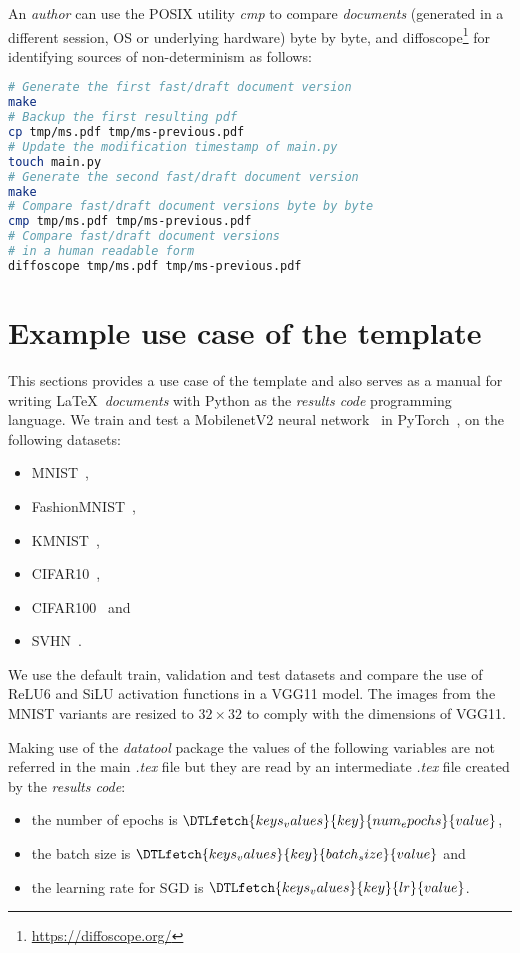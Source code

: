\documentclass[journal]{IEEEtran}
\begin{document}
An \textit{author} can use the POSIX utility \textit{cmp} to compare \textit{documents} (generated in a different session, OS or underlying hardware) byte by byte, and diffoscope\footnote{\url{https://diffoscope.org/}} for identifying sources of non-determinism as follows:
\begin{lstlisting}[language=bash, style=lststyle, caption={Test fast/draft document reproducibility.}]
# Generate the first fast/draft document version
make
# Backup the first resulting pdf
cp tmp/ms.pdf tmp/ms-previous.pdf
# Update the modification timestamp of main.py
touch main.py
# Generate the second fast/draft document version
make
# Compare fast/draft document versions byte by byte
cmp tmp/ms.pdf tmp/ms-previous.pdf
# Compare fast/draft document versions
# in a human readable form
diffoscope tmp/ms.pdf tmp/ms-previous.pdf
\end{lstlisting}

\section{Example use case of the template}
This sections provides a use case of the template and also serves as a manual for writing \LaTeX\ \textit{documents} with Python as the \textit{results code} programming language.
We train and test a MobilenetV2 neural network~\cite{sandler2018mobilenetv2} in PyTorch~\cite{paszke2019pytorch}, on the following datasets:
\begin{itemize}
	\item MNIST~\cite{lecun2010mnist},
	\item FashionMNIST~\cite{xiao2017fashion},
	\item KMNIST~\cite{clanuwat2018deep},
	\item CIFAR10~\cite{krizhevsky2009learning},
	\item CIFAR100~\cite{krizhevsky2009learning} and
	\item SVHN~\cite{netzer2011reading}.
\end{itemize}

We use the default train, validation and test datasets and compare the use of ReLU6\cite{dahl2013improving} and SiLU\cite{elfwing2018sigmoid} activation functions in a VGG11 model.
The images from the MNIST variants are resized to $32\times 32$ to comply with the dimensions of VGG11.

Making use of the \textit{datatool} package the values of the following variables are not referred in the main \textit{.tex} file but they are read by an intermediate \textit{.tex} file created by the \textit{results code}:
\begin{itemize}
	\item the number of epochs is $\DTLfetch{keys_values}{key}{num_epochs}{value}$,
	\item the batch size is $\DTLfetch{keys_values}{key}{batch_size}{value}$ and
	\item the learning rate for SGD is $\DTLfetch{keys_values}{key}{lr}{value}$.
\end{itemize}
\end{document}
